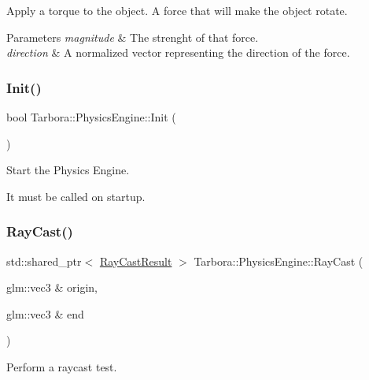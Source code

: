 Apply a torque to the object. A force that will make the object rotate. 


\begin{DoxyParams}{Parameters}
{\em magnitude} & The strenght of that force. \\
\hline
{\em direction} & A normalized vector representing the direction of the force. \\
\hline
\end{DoxyParams}
\mbox{\label{classTarbora_1_1PhysicsEngine_a7ec00bd287d1366ce059f2821b023634}} 
\subsubsection{\texorpdfstring{Init()}{Init()}}
{\footnotesize\ttfamily bool Tarbora\+::\+Physics\+Engine\+::\+Init (\begin{DoxyParamCaption}{ }\end{DoxyParamCaption})\hspace{0.3cm}{\ttfamily [static]}}



Start the Physics Engine. 

It must be called on startup. \mbox{\label{classTarbora_1_1PhysicsEngine_a4650b5c17a52953357ae693f5c07bf68}} 
\subsubsection{\texorpdfstring{Ray\+Cast()}{RayCast()}}
{\footnotesize\ttfamily std\+::shared\+\_\+ptr$<$ \hyperlink{structTarbora_1_1RayCastResult}{Ray\+Cast\+Result} $>$ Tarbora\+::\+Physics\+Engine\+::\+Ray\+Cast (\begin{DoxyParamCaption}\item[{glm\+::vec3 \&}]{origin,  }\item[{glm\+::vec3 \&}]{end }\end{DoxyParamCaption})\hspace{0.3cm}{\ttfamily [static]}}



Perform a raycast test. 


